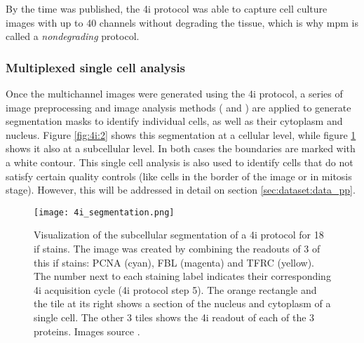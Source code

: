 By the time \cite{Guteaar7042} was published, the \gls{4i} protocol was able to capture cell culture images with up to 40 channels without degrading the tissue, which is why \gls{mpm} is called a \textit{nondegrading} protocol.

\subsubsection{Multiplexed single cell analysis}

Once the multichannel images were generated using the \gls{4i} protocol, a series of image preprocessing and image analysis methods (\cite{Carpenter2006} and \cite{snijder2012single}) are applied to generate segmentation masks to identify individual cells, as well as their cytoplasm and nucleus. Figure \ref{fig:4i:2} shows this segmentation at a cellular level, while figure \ref{fig:4i:segmentation} shows it also at a subcellular level. In both cases the boundaries are marked with a white contour. This single cell analysis is also used to identify cells that do not satisfy certain quality controls (like cells in the border of the image or in mitosis stage). However, this will be addressed in detail on section \ref{sec:dataset:data_pp}.

\begin{figure}[htb]
  \centering
  \texttt{[image: 4i\_segmentation.png]}
  \caption{Visualization of the subcellular segmentation of a \gls{4i} protocol for 18 \gls{if} stains. The image was created by combining the readouts of 3 of this \gls{if} stains: PCNA (cyan), FBL (magenta) and TFRC (yellow). The number next to each staining label indicates their corresponding 4i acquisition cycle (\gls{4i} protocol step 5). The orange rectangle and the tile at its right shows a section of the nucleus and cytoplasm of a single cell. The other 3 tiles shows the \gls{4i} readout of each of the 3 proteins. Images source \cite{Guteaar7042}.}
  \label{fig:4i:segmentation}
\end{figure}


